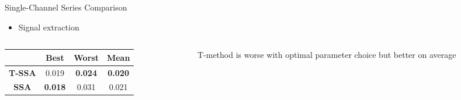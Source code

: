 \documentclass[pdf, unicode, ucs, notheorems]{beamer}
\newcommand{\bluetext}[1]{{\usebeamercolor[fg]{bluetext_color}#1}}
\theoremstyle{definition}
\begin{document}
\begin{frame}{Single-Channel Series Comparison}
  \begin{itemize}
    \item Signal extraction
  \end{itemize}
  \begin{columns}
    \begin{column}{0.65\textwidth}
      \begin{table}[ht]
        \centering
        \begin{tabular}{c|ccc}
          \hline
          & Best & Worst & Mean \\
          \hline
          \textbf{T-SSA} & 0.019 & \textbf{\bluetext{0.024}} &
          \textbf{\bluetext{0.020}} \\
          \textbf{SSA} & \textbf{\bluetext{0.018}} & 0.031 & 0.021 \\
          \hline
        \end{tabular}
      \end{table}
    \end{column}
    \begin{column}{0.35\textwidth}
      T-method is worse with optimal parameter choice but better on average
    \end{column}
  \end{columns}
\end{frame}
\end{document}
